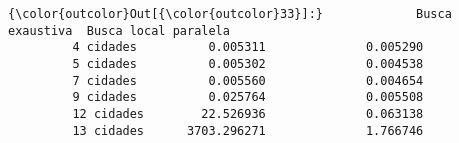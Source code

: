 \documentclass[11pt]{article}
\begin{document}
\begin{Verbatim}[commandchars=\\\{\}]
{\color{outcolor}Out[{\color{outcolor}33}]:}             Busca exaustiva  Busca local paralela
         4 cidades          0.005311              0.005290
         5 cidades          0.005302              0.004538
         7 cidades          0.005560              0.004654
         9 cidades          0.025764              0.005508
         12 cidades        22.526936              0.063138
         13 cidades      3703.296271              1.766746
\end{Verbatim}
            

    
    
    
    
\end{document}

